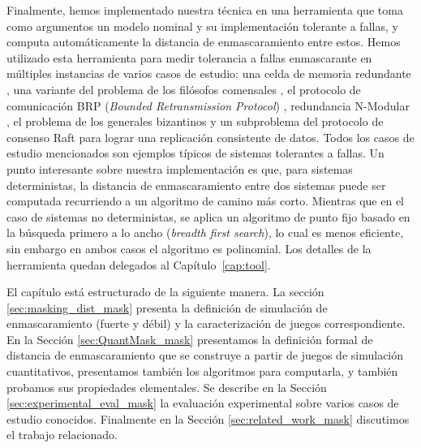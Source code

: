 Finalmente, hemos implementado nuestra técnica en una herramienta que toma como argumentos un modelo nominal y su implementación tolerante a fallas, y computa automáticamente la distancia de enmascaramiento entre estos.
Hemos utilizado esta herramienta para medir tolerancia a fallas enmascarante en múltiples instancias de varios casos de estudio: una celda de memoria redundante \cite{DemasiCMA17}, una variante del problema de los filósofos comensales \cite{Dijkstra71}, el protocolo de comunicación BRP (\emph{Bounded Retransmission Protocol}) \cite{GrooteP96}, redundancia N-Modular \cite{ShoomanBook}, el problema de los generales bizantinos \cite{LamportSP82} y un subproblema del protocolo de consenso Raft \cite{OngaroO14} para lograr una replicación consistente de datos.
Todos los casos de estudio mencionados son ejemplos típicos de sistemas tolerantes a fallas. Un punto interesante sobre nuestra implementación es que, para sistemas deterministas, la distancia de enmascaramiento entre dos sistemas puede ser computada recurriendo a un algoritmo de camino más corto. Mientras que en el caso de sistemas no deterministas, se aplica un algoritmo de punto fijo basado en la búsqueda primero a lo ancho (\emph{breadth first search}), lo cual es menos eficiente, sin embargo en ambos casos el algoritmo es polinomial. Los detalles de la herramienta quedan delegados al Capítulo~\ref{cap:tool}.

El capítulo está estructurado de la siguiente manera. La sección \ref{sec:masking_dist_mask} presenta la definición de simulación de enmascaramiento (fuerte y débil) y la caracterización de juegos correspondiente.
En la Sección \ref{sec:QuantMask_mask} presentamos la definición formal de distancia de enmascaramiento que se construye a partir de juegos de simulación cuantitativos, presentamos también los algoritmos para computarla, y también probamos sus propiedades elementales.
Se describe en la Sección \ref{sec:experimental_eval_mask} la evaluación experimental sobre varios casos de estudio conocidos. 
Finalmente en la Sección \ref{sec:related_work_mask} discutimos el trabajo relacionado. 